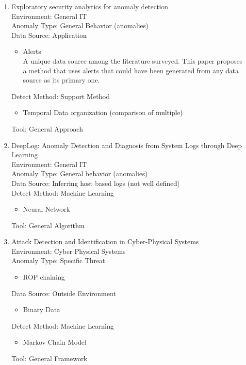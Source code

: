 \documentclass[10pt]{IEEEtran}
\begin{document}
\begin{enumerate}
    \item
    Exploratory security analytics for anomaly detection\cite{pierazzi2016exploratory}\\
    Environment: General IT\\
    Anomaly Type: General Behavior (anomalies)\\
    Data Source: Application
    \begin{itemize}
        \item Alerts\\
        A unique data source among the literature surveyed. This paper proposes a method that uses alerts that could have been generated from any data source as its primary one.
    \end{itemize}
    Detect Method: Support Method
    \begin{itemize}
        \item Temporal Data organization (comparison of multiple)
    \end{itemize}
    Tool: General Approach
    
    \item
    DeepLog: Anomaly Detection and Diagnosis from System Logs through Deep Learning\cite{du2017deeplog}\\
    Environment: General IT\\
    Anomaly Type: General behavior (anomalies)\\
    Data Source: Inferring host based logs (not well defined) \\
    Detect Method: Machine Learning 
    \begin{itemize}
        \item Neural Network
    \end{itemize}
    Tool: General Algorithm
    
    \item
    Attack Detection and Identification in Cyber-Physical Systems\cite{pasqualetti2013attack}\\
    Environment: Cyber Physical Systems\\
    Anomaly Type: Specific Threat
    \begin{itemize}
        \item ROP chaining
    \end{itemize}
    Data Source: Outside Environment
    \begin{itemize}
        \item Binary Data
    \end{itemize}
    Detect Method: Machine Learning
    \begin{itemize}
        \item Markov Chain Model
    \end{itemize}
    Tool: General Framework
    

\end{enumerate}
\end{document}

